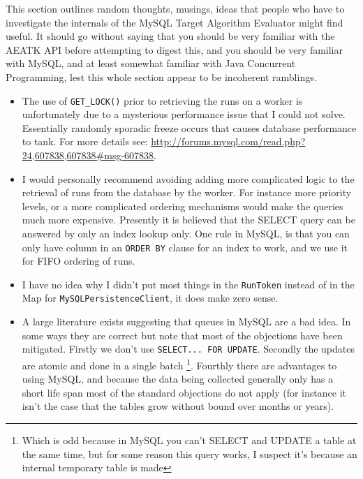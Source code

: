\documentclass[11pt,letterpaper,oneside]{article}
\begin{document}
This section outlines random thoughts, musings, ideas that people who have to investigate the internals of the MySQL Target Algorithm Evaluator might find useful. It should go without saying that you should be very familiar with the AEATK API before attempting to digest this, and you should be very familiar with MySQL, and at least somewhat familiar with Java Concurrent Programming, lest this whole section appear to be incoherent ramblings.

\begin{itemize}

\item The use of \texttt{GET\_LOCK()} prior to retrieving the runs on a worker is unfortunately due to a mysterious performance issue that I could not solve. Essentially randomly sporadic freeze occurs that causes database performance to tank. For more details see: \url{http://forums.mysql.com/read.php?24,607838,607838\#msg-607838}. 

\item I would personally recommend avoiding adding more complicated logic to the retrieval of runs from the database by the worker. For instance more priority levels, or a more complicated ordering mechanisms would make the queries much more expensive. Presently it is believed that the SELECT query can be answered by only an index lookup only. One rule in MySQL, is that you can only have column in an \texttt{ORDER BY} clause for an index to work, and we use it for FIFO ordering of runs.

\item I have no idea why I didn't put most things in the \texttt{RunToken} instead of in the Map for \texttt{MySQLPersistenceClient}, it does make zero sense.

\item A large literature exists suggesting that queues in MySQL are a bad idea. In some ways they are correct but note that most of the objections have been mitigated. Firstly we don't use \texttt{SELECT... FOR UPDATE}. Secondly the updates are atomic and done in a single batch \footnote{Which is odd because in MySQL you can't SELECT and UPDATE a table at the same time, but for some reason this query works, I suspect it's because an internal temporary table is made}. Fourthly there are advantages to using MySQL, and because the data being collected generally only has a short life span most of the standard objections do not apply (for instance it isn't the case that the tables grow without bound over months or years).


\end{itemize}
\end{document}
